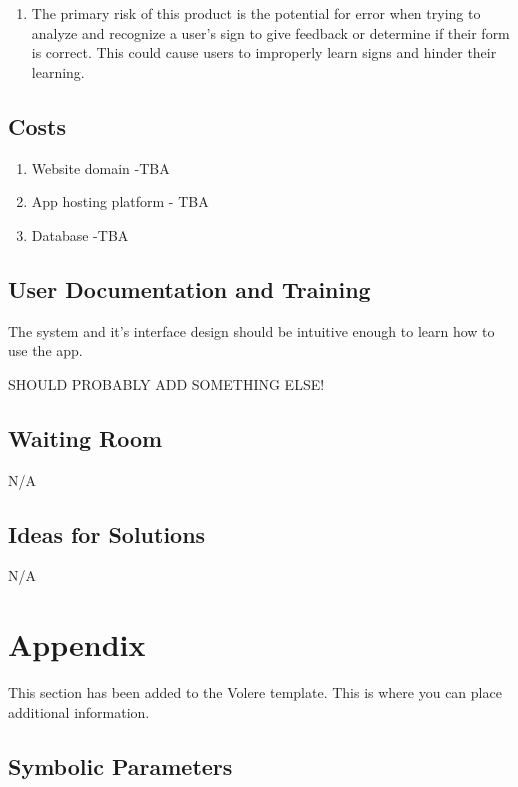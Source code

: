 \documentclass[12pt, titlepage]{article}
\begin{document}
\begin{enumerate}
    \item The primary risk of this product is the potential for error when trying to analyze and recognize a user's sign to give feedback or determine if their form is correct. This could cause users to improperly learn signs and hinder their learning.
\end{enumerate}

\subsection{Costs}
\begin{enumerate}
    \item Website domain -TBA
    \item App hosting platform - TBA
    \item Database -TBA
\end{enumerate}
\subsection{User Documentation and Training}

The system and it's interface design should be intuitive enough to learn how to use the app.

SHOULD PROBABLY ADD SOMETHING ELSE!

\subsection{Waiting Room}

N/A

\subsection{Ideas for Solutions}

N/A





\newpage

\section{Appendix}

This section has been added to the Volere template.  This is where you can place
additional information.

\subsection{Symbolic Parameters}
\end{document}

